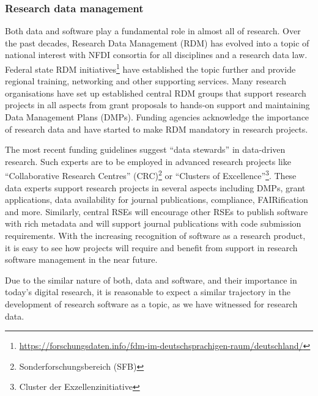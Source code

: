 \documentclass[a4paper]{article}
\begin{document}
\subsubsection{Research data management}
Both data and software play a fundamental role in almost all of research.
Over the past decades, Research Data Management (RDM) has evolved into a topic of national interest with NFDI consortia for all disciplines and a research data law.
Federal state RDM initiatives\footnote{\url{https://forschungsdaten.info/fdm-im-deutschsprachigen-raum/deutschland/}} have established the topic further and provide regional training, networking and other supporting services.
Many research organisations have set up established central RDM groups that support research projects in all aspects from grant proposals to hands-on support and maintaining Data Management Plans (DMPs).
Funding agencies acknowledge the importance of research data and have started to make RDM mandatory in research projects.

The most recent funding guidelines suggest “data stewards” in data-driven research.
Such experts are to be employed in advanced research projects like “Collaborative Research Centres” (CRC)\footnote{Sonderforschungsbereich (SFB)} or “Clusters of Excellence”\footnote{Cluster der Exzellenzinitiative}.
These data experts support research projects in several aspects including DMPs, grant applications, data availability for journal publications, compliance, FAIRification and more.
Similarly, central RSEs will encourage other RSEs to publish software with rich metadata and will support journal publications with code submission requirements.
With the increasing recognition of software as a research product, it is easy to see how projects will require and benefit from support in research software management in the near future.

Due to the similar nature of both, data and software, and their importance in today's digital research, it is reasonable to expect a similar trajectory in the development of research software as a topic, as we have witnessed for research data.
\end{document}
